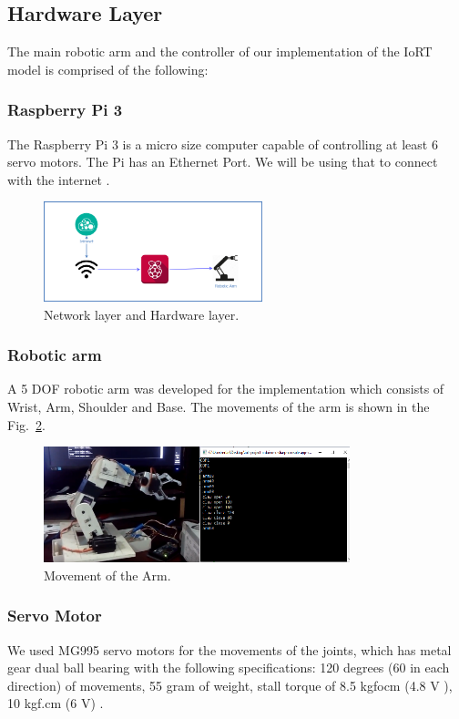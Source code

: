 \documentclass[conference]{IEEEtran}
\begin{document}
\subsection{Hardware Layer}
The main robotic arm and the controller of our implementation of the IoRT model is comprised of the following:

\subsubsection{Raspberry Pi 3}
The Raspberry Pi 3 is a micro size computer capable of controlling at least 6 servo motors. The Pi has an Ethernet Port. We will be using that to connect with the internet \cite{fifteen,sixteen}.

\begin{figure}[ht!] %
 \centering
 \includegraphics[width=2.5in]{d.png}
 \caption{Network layer and Hardware layer.}
 \label{NetworkHardwareLayer}
 \end{figure}


\subsubsection{Robotic arm}
A 5 DOF robotic arm was developed for the implementation which consists of Wrist, Arm, Shoulder and Base. The movements of the arm is shown in the Fig.~\ref{armMovement}.
\begin{figure}[ht!] %
 \centering
 \includegraphics[width=3.5in]{Picture3a.png}
 \caption{Movement of the Arm.}
 \label{armMovement}
 \end{figure}


\subsubsection{Servo Motor}
We used MG995 servo motors for the movements of the joints, which has metal gear dual ball bearing with the following specifications: 120 degrees (60 in each direction) of movements, 55 gram of weight, stall torque of 8.5 kgfocm (4.8 V ), 10 kgf.cm (6 V) \cite{seventeen}.
\end{document}
